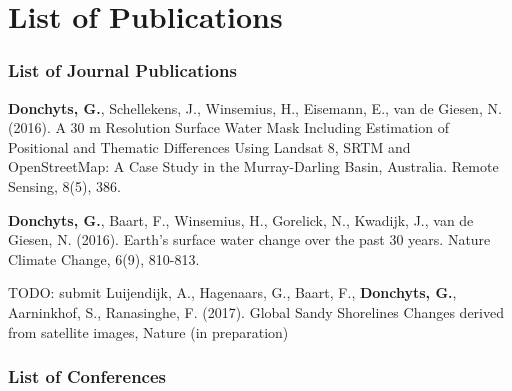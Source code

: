 \chapter*{List of Publications}

\label{publications}

\subsection*{List of Journal Publications}

\begin{etaremune}{\small

\item \textbf{Donchyts, G.}, Schellekens, J., Winsemius, H., Eisemann, E., van de Giesen, N. (2016). A 30 m Resolution Surface Water Mask Including Estimation of Positional and Thematic Differences Using Landsat 8, SRTM and OpenStreetMap: A Case Study in the Murray-Darling Basin, Australia. Remote Sensing, 8(5), 386.

\item \textbf{Donchyts, G.}, Baart, F., Winsemius, H., Gorelick, N., Kwadijk, J., van de Giesen, N. (2016). Earth's surface water change over the past 30 years. Nature Climate Change, 6(9), 810-813.

\item TODO: submit Luijendijk, A., Hagenaars, G., Baart, F., \textbf{Donchyts, G.}, Aarninkhof, S., Ranasinghe, F. (2017). Global Sandy Shorelines Changes derived from satellite images, Nature (in preparation)



}\end{etaremune}


\subsection*{List of Conferences}

